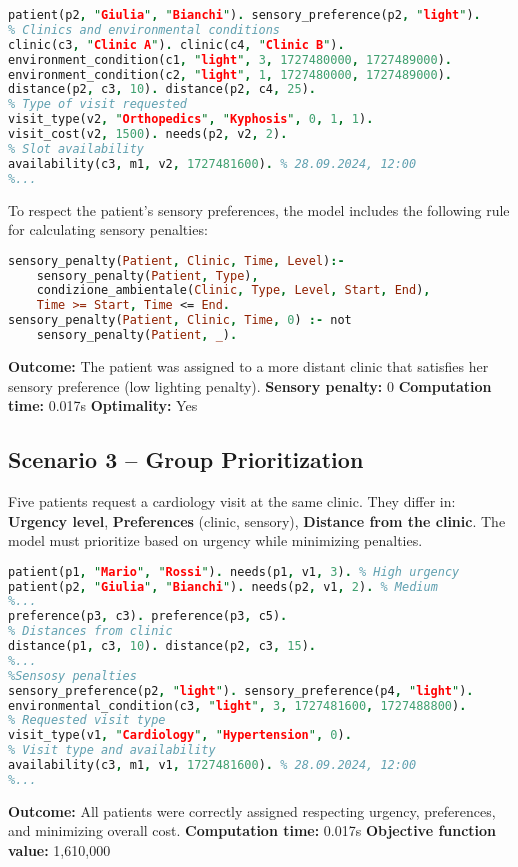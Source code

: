 \documentclass{tlp}
\begin{document}
\begin{lstlisting}[language=Prolog,caption={ASP facts for Scenario 2 – Sensory preference for brightness},label={lst:scenario2}]
% Patient and sensory preference
patient(p2, "Giulia", "Bianchi"). sensory_preference(p2, "light").
% Clinics and environmental conditions
clinic(c3, "Clinic A"). clinic(c4, "Clinic B").
environment_condition(c1, "light", 3, 1727480000, 1727489000).
environment_condition(c2, "light", 1, 1727480000, 1727489000).
distance(p2, c3, 10). distance(p2, c4, 25).
% Type of visit requested
visit_type(v2, "Orthopedics", "Kyphosis", 0, 1, 1).
visit_cost(v2, 1500). needs(p2, v2, 2).
% Slot availability
availability(c3, m1, v2, 1727481600). % 28.09.2024, 12:00
%...
\end{lstlisting}
To respect the patient’s sensory preferences, the model includes the following rule for calculating sensory penalties:
\begin{lstlisting}[language=Prolog, caption={Evaluation of sensory penalty based on clinic environment}]
sensory_penalty(Patient, Clinic, Time, Level):-
    sensory_penalty(Patient, Type),
    condizione_ambientale(Clinic, Type, Level, Start, End),
    Time >= Start, Time <= End.
sensory_penalty(Patient, Clinic, Time, 0) :- not
    sensory_penalty(Patient, _).
\end{lstlisting}

\textbf{Outcome:} The patient was assigned to a more distant clinic that satisfies her sensory preference (low lighting penalty). \textbf{Sensory penalty:} 0 \textbf{Computation time:} 0.017s \textbf{Optimality:} Yes

\vspace{-0.45cm}
\subsection{Scenario 3 – Group Prioritization}

Five patients request a cardiology visit at the same clinic. They differ in: \textbf{Urgency level}, \textbf{Preferences} (clinic, sensory), \textbf{Distance from the clinic}.
The model must prioritize based on urgency while minimizing penalties.
\begin{lstlisting}[language=Prolog,caption={ASP facts for Scenario 3 – Prioritization of 5 patients with limited slots},label={lst:scenario3}]
% Patients and urgency levels
patient(p1, "Mario", "Rossi"). needs(p1, v1, 3). % High urgency
patient(p2, "Giulia", "Bianchi"). needs(p2, v1, 2). % Medium 
%...
preference(p3, c3). preference(p3, c5).
% Distances from clinic
distance(p1, c3, 10). distance(p2, c3, 15).
%...
%Sensosy penalties
sensory_preference(p2, "light"). sensory_preference(p4, "light").
environmental_condition(c3, "light", 3, 1727481600, 1727488800).
% Requested visit type
visit_type(v1, "Cardiology", "Hypertension", 0).
% Visit type and availability
availability(c3, m1, v1, 1727481600). % 28.09.2024, 12:00
%...
\end{lstlisting}
\textbf{Outcome:} All patients were correctly assigned respecting urgency, preferences, and minimizing overall cost. \textbf{Computation time:} 0.017s \textbf{Objective function value:} 1,610,000
\end{document}
